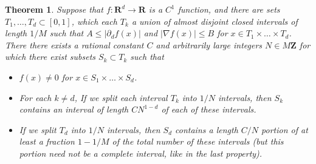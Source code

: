 \documentclass{article}
\theoremstyle{plain}
\theoremstyle{plain}
\newtheorem{theorem}{Theorem}
\begin{document}
\begin{theorem}
    Suppose that $f: \mathbf{R}^d \to \mathbf{R}$ is a $C^1$ function, and there are sets $T_1, \dots, T_d \subset [0,1]$, which each $T_k$ a union of almost disjoint closed intervals of length $1/M$ such that $A \leq |\partial_d f(x)|$ and $|\nabla f(x)| \leq B$ for $x \in T_1 \times \dots \times T_d$. There there exists a rational constant $C$ and arbitrarily large integers $N \in M\mathbf{Z}$ for which there exist subsets $S_k \subset T_k$ such that
    \begin{itemize}
        \item[(i)] $f(x) \neq 0$ for $x \in S_1 \times \dots \times S_d$.

        \item[(ii)] For each $k \neq d$, If we split each interval $T_k$ into $1/N$ intervals, then $S_k$ contains an interval of length $CN^{1-d}$ of each of these intervals.

        \item[(iii)] If we split $T_d$ into $1/N$ intervals, then $S_d$ contains a length $C/N$ portion of at least a fraction $1 - 1/M$ of the total number of these intervals (but this portion need not be a complete interval, like in the last property).
    \end{itemize}
\end{theorem}
\end{document}

